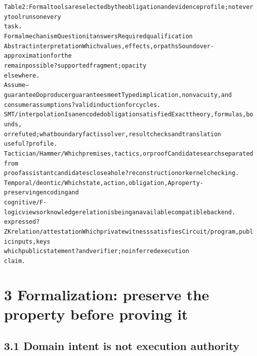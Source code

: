\documentclass{article}
\begin{document}
\begingroup\fontsize{7}{8.4}\selectfont
\begin{alltt}
Table 2: Formal tools are selected by the obligation and evidence profile; not every tool runs on every
task.
Formal mechanism            Question it answers                   Required qualification
Abstract interpretation     Which values, effects, or paths       Sound over-approximation for the
                            remain possible?                      supported fragment; opacity
                                                                  elsewhere.
Assume–guarantee            Do producer guarantees meet           Typed implication, nonvacuity, and
                            consumer assumptions?                 valid induction for cycles.
SMT / interpolation         Is an encoded obligation satisfied    Exact theory, formulas, bounds,
                            or refuted; what boundary fact is     solver, result checks and translation
                            useful?                               profile.
Tactician / Hammer /        Which premises, tactics, or proof     Candidate search separated from
proof assistant             candidates close a hole?              reconstruction or kernel checking.
Temporal / deontic /        Which state, action, obligation,      A property-preserving encoding and
cognitive / F-logic views   or knowledge relation is being        an available compatible backend.
                            expressed?
ZK relation / attestation   Which private witness satisfies       Circuit/program, public inputs, keys
                            which public statement?               and verifier; no inferred execution
                                                                  claim.
\end{alltt}\endgroup



\section*{3 Formalization: preserve the property before proving it}

\subsection*{3.1 Domain intent is not execution authority}
\end{document}
